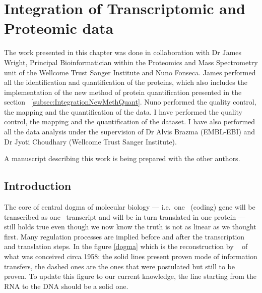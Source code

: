 \chapter{Integration of Transcriptomic and Proteomic data}

The work presented in this chapter was done in collaboration with Dr James Wright,
Principal Bioinformatician within the Proteomics and Mass Spectrometry unit of the
Wellcome Trust Sanger Institute and Nuno Fonseca. James performed all the
identification and quantification of the proteins, which also includes the
implementation of the new method of protein quantification presented in the
section ~\ref{subsec:IntegrationNewMethQuant}. Nuno performed the quality control, the mapping
and the quantification of the  data. I have performed the quality control,
the mapping and the quantification of the  dataset. I have also performed
all the data analysis under the supervision of Dr Alvis Brazma (EMBL-EBI) and
Dr Jyoti Choudhary (Wellcome Trust Sanger Institute).

A manuscript describing this work is being prepared with the other authors.

\section{Introduction}\raggedbottom
\label{sec:IntegrationIntro}
%
%


The core of central dogma of molecular biology --- i.e.\ one \DNA\ (coding) gene will
be transcribed as one \mRNA\ transcript and will be in turn translated in one
protein --- still holds true even though we now know the truth is not as linear as
we thought first. Many regulation processes are implied before
and after the transcription and translation steps.
In the figure \ref{dogma} which is the reconstruction by ~\cite{Crick:1958} of
what was conceived circa 1958: the solid lines present proven mode of information
transfers, the dashed ones are the ones that were postulated but still to be proven.
To update this figure to our current knowledge, the line starting from the RNA to
the DNA should be a solid one.

